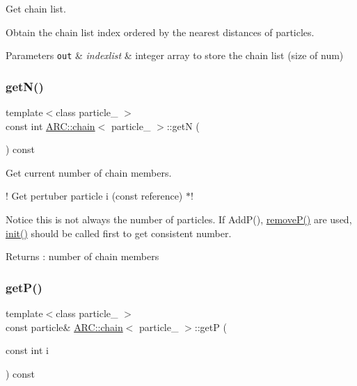 Get chain list. 

Obtain the chain list index ordered by the nearest distances of particles. 
\begin{DoxyParams}[1]{Parameters}
\mbox{\tt out}  & {\em indexlist} & integer array to store the chain list (size of num) \\
\hline
\end{DoxyParams}
\hypertarget{classARC_1_1chain_a6069646256b45896e6395205826ad05f}{}\label{classARC_1_1chain_a6069646256b45896e6395205826ad05f} 
\subsubsection{\texorpdfstring{get\+N()}{getN()}}
{\footnotesize\ttfamily template$<$class particle\+\_\+ $>$ \\
const int \hyperlink{classARC_1_1chain}{A\+R\+C\+::chain}$<$ particle\+\_\+ $>$\+::getN (\begin{DoxyParamCaption}{ }\end{DoxyParamCaption}) const\hspace{0.3cm}{\ttfamily [inline]}}



Get current number of chain members. 

! Get pertuber particle i (const reference) $\ast$!

Notice this is not always the number of particles. If Add\+P(), \hyperlink{classARC_1_1chain_a8ba21a4be849607692d73e846802a287}{remove\+P()} are used, \hyperlink{classARC_1_1chain_a9ddc18539223abcb6451805abc15aea9}{init()} should be called first to get consistent number. \begin{DoxyReturn}{Returns}
\+: number of chain members 
\end{DoxyReturn}
\hypertarget{classARC_1_1chain_a256800adf6453d8550cdc6c3212959a0}{}\label{classARC_1_1chain_a256800adf6453d8550cdc6c3212959a0} 
\subsubsection{\texorpdfstring{get\+P()}{getP()}}
{\footnotesize\ttfamily template$<$class particle\+\_\+ $>$ \\
const particle\& \hyperlink{classARC_1_1chain}{A\+R\+C\+::chain}$<$ particle\+\_\+ $>$\+::getP (\begin{DoxyParamCaption}\item[{const int}]{i }\end{DoxyParamCaption}) const\hspace{0.3cm}{\ttfamily [inline]}}



